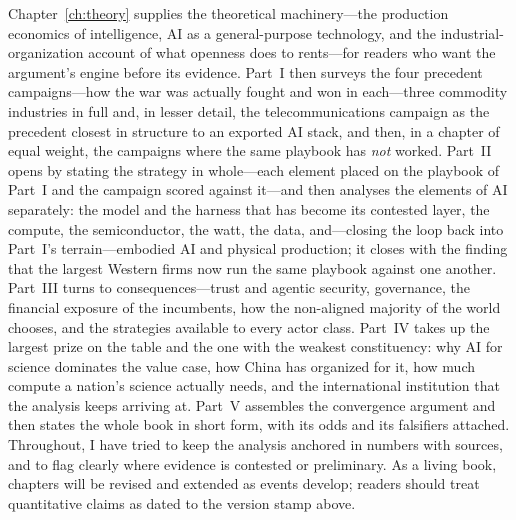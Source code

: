 \documentclass[11pt,a4paper,oneside]{book}
\begin{document}
Chapter~\ref{ch:theory} supplies the theoretical machinery---the production economics of intelligence, AI as a general-purpose technology, and the industrial-organization account of what openness does to rents---for readers who want the argument's engine before its evidence. Part~I then surveys the four precedent campaigns---how the war was actually fought and won in each---three commodity industries in full and, in lesser detail, the telecommunications campaign as the precedent closest in structure to an exported AI stack, and then, in a chapter of equal weight, the campaigns where the same playbook has \emph{not} worked. Part~II opens by stating the strategy in whole---each element placed on the playbook of Part~I and the campaign scored against it---and then analyses the elements of AI separately: the model and the harness that has become its contested layer, the compute, the semiconductor, the watt, the data, and---closing the loop back into Part~I's terrain---embodied AI and physical production; it closes with the finding that the largest Western firms now run the same playbook against one another. Part~III turns to consequences---trust and agentic security, governance, the financial exposure of the incumbents, how the non-aligned majority of the world chooses, and the strategies available to every actor class. Part~IV takes up the largest prize on the table and the one with the weakest constituency: why AI for science dominates the value case, how China has organized for it, how much compute a nation's science actually needs, and the international institution that the analysis keeps arriving at. Part~V assembles the convergence argument and then states the whole book in short form, with its odds and its falsifiers attached. Throughout, I have tried to keep the analysis anchored in numbers with sources, and to flag clearly where evidence is contested or preliminary. As a living book, chapters will be revised and extended as events develop; readers should treat quantitative claims as dated to the version stamp above.
\end{document}
